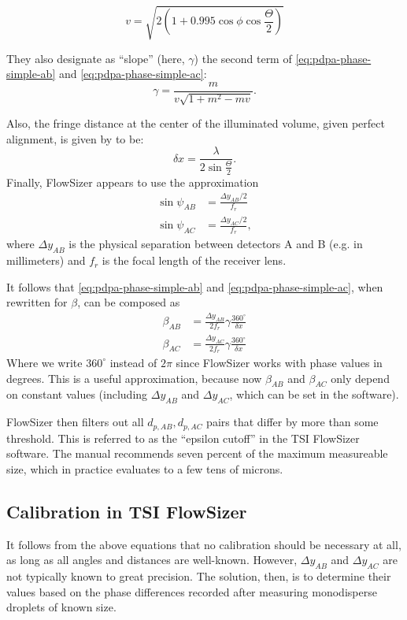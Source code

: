 \documentclass[11.5pt,oneside]{book}
\begin{document}
\begin{equation}
    v = \sqrt{2(1 + 0.995 \cos \phi \cos \frac{\Theta}{2})}
\end{equation}

They also designate as ``slope'' (here, $\gamma$) the second term of
\eqref{eq:pdpa-phase-simple-ab} and \eqref{eq:pdpa-phase-simple-ac}:
\begin{equation}
    \gamma = \frac{m}{v \sqrt{1 + m^2 - mv}}.
\end{equation}

Also, the fringe distance at the center of the illuminated volume, given
perfect alignment, is given by \citet{Albrecht03} to be:
\begin{equation}
    \delta x = \frac{\lambda}{2 \sin \frac{\Theta}{2}}.
\end{equation}
Finally, FlowSizer appears to use the approximation 
\begin{align}
    \sin \psi_{AB} &= \frac{\Delta y_{AB}/2}{f_r} \\
    \sin \psi_{AC} &= \frac{\Delta y_{AC}/2}{f_r},
\end{align}
where $\Delta y_{AB}$ is the physical separation between detectors A and B (e.g. in
millimeters) and $f_r$ is the focal length of the receiver lens.

It follows that \eqref{eq:pdpa-phase-simple-ab} and \eqref{eq:pdpa-phase-simple-ac}, when
rewritten for $\beta$, can be composed as
\begin{align}
    \beta_{AB} &= \frac{\Delta y_{AB}}{2f_r} \gamma \frac{360^\circ}{\delta x} \\
    \beta_{AC} &= \frac{\Delta y_{AC}}{2f_r} \gamma \frac{360^\circ}{\delta x}
\end{align}
Where we write $360^\circ$ instead of $2\pi$ since FlowSizer works with phase
values in degrees. This is a useful approximation, because now $\beta_{AB}$ and
$\beta_{AC}$ only depend on constant values (including $\Delta y_{AB}$ and
$\Delta y_{AC}$, which can be set in the software).

FlowSizer then filters out all $d_{p,AB}, d_{p,AC}$ pairs that differ by more than some
threshold. This is referred to as the ``epsilon cutoff'' in the TSI FlowSizer
software. The manual recommends seven percent of the maximum measureable size,
which in practice evaluates to a few tens of microns.

\subsection{Calibration in TSI FlowSizer}
It follows from the above equations that no calibration should be necessary at
all, as long as all angles and distances are well-known. However, $\Delta
y_{AB}$ and $\Delta y_{AC}$ are not typically known to great precision. The
solution, then, is to determine their values based on the phase differences
recorded after measuring monodisperse droplets of known size.
\end{document}
